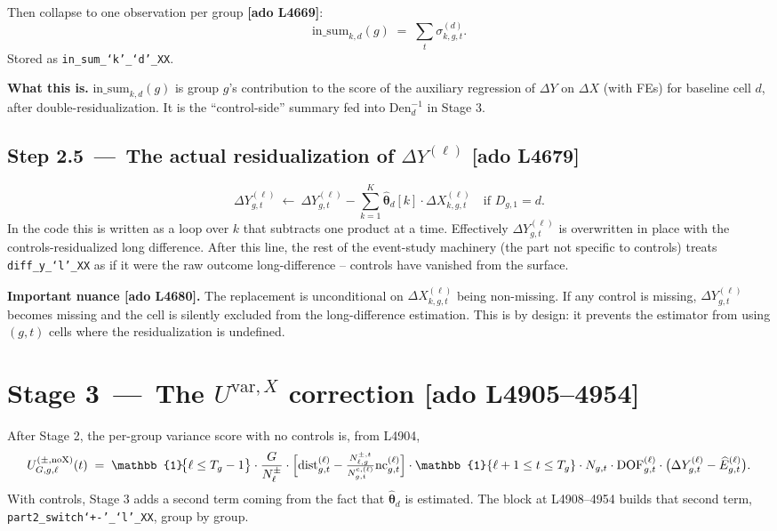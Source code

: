 \documentclass[11pt]{article}
\newcommand{\code}[1]{\texttt{\small #1}}
\newcommand{\Adoref}[1]{\textcolor{accent}{\footnotesize\textbf{[ado L#1]}}}
\newcommand{\1}{\mathbb{1}}
\newcommand{\thetad}{\widehat{\bm{\theta}}_d}
\newcommand{\Ngt}{N_{g,t}}
\begin{document}
\medskip
Then collapse to one observation per group \Adoref{4669}:
\begin{equation}
\boxed{\;\mathrm{in\_sum}_{k,d}(g) \;=\; \sum_{t}\sigma^{(d)}_{k,g,t}.\;}
\label{eq:insum}
\end{equation}
Stored as \code{in\_sum\_`k'\_`d'\_XX}.

\medskip\noindent
\textbf{What this is.} $\mathrm{in\_sum}_{k,d}(g)$ is group $g$'s contribution
to the score of the auxiliary regression of $\Delta Y$ on $\Delta X$ (with FEs)
for baseline cell $d$, after double-residualization. It is the
``control-side'' summary fed into $\mathrm{Den}_d^{-1}$ in Stage 3.

\subsection*{Step 2.5 \,---\, The actual residualization of $\Delta Y^{(\ell)}$ \Adoref{4679}}

\begin{equation}
\boxed{\;\Delta Y^{(\ell)}_{g,t}\ \leftarrow\ \Delta Y^{(\ell)}_{g,t} - \sum_{k=1}^{K}\thetad[k]\cdot \Delta X^{(\ell)}_{k,g,t}\quad\text{if }D_{g,1}=d.\;}
\label{eq:residY}
\end{equation}
In the code this is written as a loop over $k$ that subtracts one product at a
time. Effectively $\Delta Y^{(\ell)}_{g,t}$ is overwritten in place with the
controls-residualized long difference. After this line, the rest of the
event-study machinery (the part not specific to controls) treats
\code{diff\_y\_`l'\_XX} as if it were the raw outcome long-difference --
controls have vanished from the surface.

\medskip\noindent
\textbf{Important nuance \Adoref{4680}.} The replacement is unconditional on
$\Delta X^{(\ell)}_{k,g,t}$ being non-missing. If any control is missing,
$\Delta Y^{(\ell)}_{g,t}$ becomes missing and the cell is silently excluded
from the long-difference estimation. This is by design: it prevents the
estimator from using $(g,t)$ cells where the residualization is undefined.

\section[Stage 3 -- Variance correction U-var-X (L4905--4954)]{Stage 3 \,---\, The $U^{\mathrm{var},X}$ correction \Adoref{4905--4954}}

After Stage 2, the per-group variance score with no controls is, from L4904,
\begin{equation}
U^{(\pm,\mathrm{noX})}_{G,g,\ell}(t) \;=\; \1\!\bigl\{\ell\le T_g-1\bigr\}\cdot \frac{G}{N^{\pm}_{\ell}}\cdot \Bigl[\mathrm{dist}^{(\ell)}_{g,t} - \tfrac{N^{\pm,t}_{\ell,g}}{N^{\mathrm{c},(\ell)}_{g,t}}\mathrm{nc}^{(\ell)}_{g,t}\Bigr]\cdot \1\{\ell+1\le t\le T_g\}\cdot \Ngt\cdot \mathrm{DOF}^{(\ell)}_{g,t}\cdot \bigl(\Delta Y^{(\ell)}_{g,t} - \widehat{E}^{(\ell)}_{g,t}\bigr).
\label{eq:UnoX}
\end{equation}
With controls, Stage 3 adds a second term coming from the fact that
$\thetad$ is estimated. The block at L4908--4954 builds that second term,
\code{part2\_switch`+\!-'\_`l'\_XX}, group by group.
\end{document}
